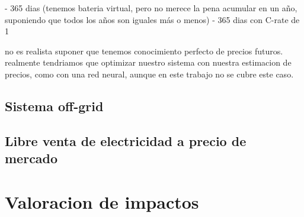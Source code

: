 - 365 dias (tenemos bateria virtual, pero no merece la pena acumular en un año, suponiendo que todos los años son iguales más o menos)
- 365 dias con C-rate de 1

no es realista suponer que tenemos conocimiento perfecto de precios futuros.
realmente tendriamos que optimizar nuestro sistema con nuestra estimacion
de precios, como con una red neural, aunque en este trabajo no se cubre este caso.

\subsection{Sistema off-grid}

\subsection{Libre venta de electricidad a precio de mercado}

\section{Valoracion de impactos}
